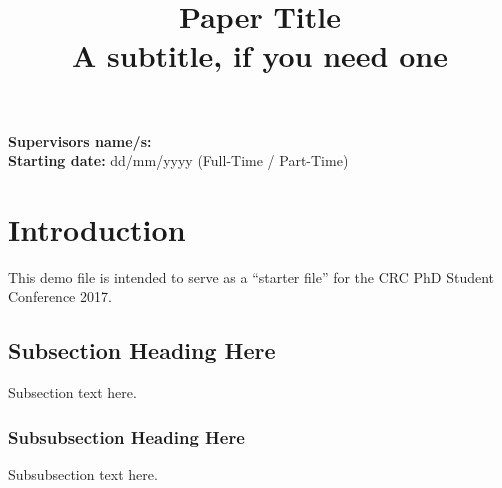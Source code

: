 \documentclass[10pt, conference,a4paper]{IEEEtran}
\begin{document}
%
\title{Paper Title \\ \vspace{0.3\baselineskip} \Large{A subtitle, if you need one}} %

\author{ 
}

\maketitle

\noindent
\textbf{Supervisors name/s:}\\
\textbf{Starting date:} dd/mm/yyyy (Full-Time / Part-Time)



\section{Introduction}
This demo file is intended to serve as a ``starter file''
for the CRC PhD Student Conference 2017.


\subsection{Subsection Heading Here}
Subsection text here.


\subsubsection{Subsubsection Heading Here}
Subsubsection text here.


%
%
\end{document}
